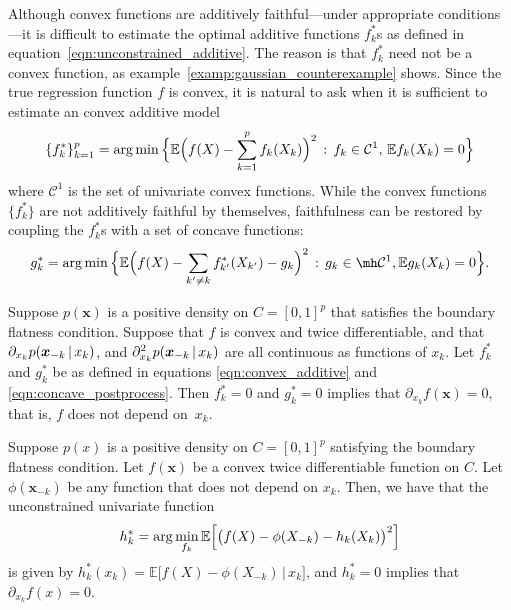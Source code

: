 Although convex functions are additively faithful---under appropriate conditions---it is difficult to
estimate the optimal additive functions $f^*_k$s as defined in
equation~\eqref{eqn:unconstrained_additive}.  The reason is that $f^*_k$ need not be
a convex function, as example~\ref{examp:gaussian_counterexample}
shows. 
Since the true regression function $f$ is convex, it is natural to ask when it is sufficient to estimate an convex additive model
\begin{equation}
\label{eqn:convex_additive}
\{ f^*_k \}_{k=1}^p = \arg\min \Big \{ 
    {\mathbb E}\Bigl( f(X) - \sum_{k=1}^p f_k(X_k) \Bigr)^2 \,:\, f_k \in \mathcal{C}^1, \, {\mathbb E} f_k(X_k) = 0 \Big \}
\end{equation}
where $\mathcal{C}^1$ is the set of univariate convex functions.
While the convex functions $\{f^*_k\}$ are not additively faithful by
themselves, faithfulness can be restored by coupling the $f^*_k$s with a set of concave functions:
\begin{equation}
\label{eqn:concave_postprocess}
g^*_k = \arg\min \Big\{
   \E\Bigl( f(X) - \sum_{k' \neq k} f^*_{k'}(X_{k'}) - g_k \Bigr)^2
    \,:\, g_k \in \mh \mathcal{C}^1, \E g_k(X_k) = 0 
  \Big\}.
\end{equation}

\begin{theorem}
\label{thm:acdc_faithful}
Suppose $p(\mathbf{x})$ is a positive density on $C=[0,1]^p$ that
satisfies the boundary flatness condition. Suppose that $f$ is convex
and twice differentiable, and that $\partial_{x_k} p( \mbox{\boldmath $x$}_{-k} {\,|\,} x_k )$, and
$\partial_{x_k}^2 p( \mbox{\boldmath $x$}_{-k} {\,|\,} x_k)$ are all continuous
as functions of $x_k$.  Let $f^*_k$ and $g^*_k$ be as defined in equations
\eqref{eqn:convex_additive} and \eqref{eqn:concave_postprocess}.  Then
$f^*_k = 0$ and $g^*_k = 0$ implies that $\partial_{x_k} f(\mathbf{x})
= 0$, that is, $f$ does not depend on~$x_k$.
\end{theorem}

\begin{lemma}
\label{cor:faithfulness_extension}
Suppose $p(x)$ is a positive density on $C=[0,1]^p$ satisfying the boundary flatness condition.
Let $f(\mathbf{x})$ be a convex twice differentiable function on $C$. Let $\phi(\mathbf{x}_{-k})$ be any function that does not depend on $x_k$. Then, we have that the unconstrained univariate function
 \begin{align}
h^*_k = \arg\min_{f_k} \mathbb{E} \Bigl[\bigl( f(X) 
           - \phi(X_{-k}) - h_k(X_k) \bigr)^2\Bigr]
\end{align}
is given by $h^*_k(x_k) = \mathbb{E}\bigl[ f(X) - \phi(X_{-k}) \,|\, x_k\bigr]$,
and $ h^*_k = 0$ implies that $\partial_{x_k} f(x) = 0$.
\end{lemma}

